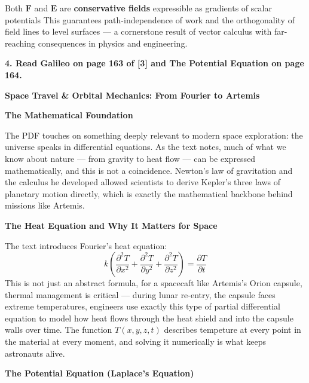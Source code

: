 \begin{respuesta}
Both $\mathbf{F}$ and $\mathbf{E}$ are \textbf{conservative fields} expressible as gradients of scalar potentials This guarantees path-independence of work and the orthogonality of field lines to level surfaces --- a cornerstone result of vector calculus with far-reaching consequences in physics and engineering.

\end{respuesta}
















\textbf{4. Read Galileo on page 163 of [3] and The Potential Equation on page 164.}
\begin{respuesta}
\textbf{Space Travel \& Orbital Mechanics: From Fourier to Artemis}

\medskip

\textbf{The Mathematical Foundation}

The PDF touches on something deeply relevant to modern space exploration: the universe speaks in differential equations. As the text notes, much of what we know about nature — from gravity to heat flow — can be expressed mathematically, and this is not a coincidence. Newton's law of gravitation and the calculus he developed allowed scientists to derive Kepler's three laws of planetary motion directly, which is exactly the mathematical backbone behind missions like Artemis.

\medskip

\textbf{The Heat Equation and Why It Matters for Space}

The text introduces Fourier's heat equation:
\[
k\left(\frac{\partial^2 T}{\partial x^2} + \frac{\partial^2 T}{\partial y^2} + \frac{\partial^2 T}{\partial z^2}\right) = \frac{\partial T}{\partial t}
\]
This is not just an abstract formula, for a spacecaft like Artemis's Orion capsule, thermal management is critical — during lunar re-entry, the capsule faces extreme temperatures, engineers use exactly this type of partial differential equation to model how heat flows through the heat shield and into the capsule walls over time. The function $T(x,y,z,t)$ describes tempeture at every point in the material at every moment, and solving it numerically is what keeps astronauts alive.

\medskip

\textbf{The Potential Equation (Laplace's Equation)}


\end{respuesta}
